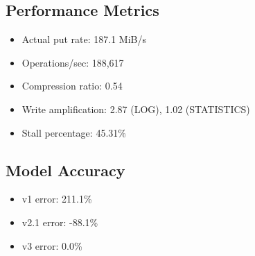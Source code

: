 \documentclass[11pt,twocolumn]{article}
\begin{document}
\subsection{Performance Metrics}
\begin{itemize}
    \item Actual put rate: 187.1 MiB/s
    \item Operations/sec: 188,617
    \item Compression ratio: 0.54
    \item Write amplification: 2.87 (LOG), 1.02 (STATISTICS)
    \item Stall percentage: 45.31\%
\end{itemize}

\subsection{Model Accuracy}
\begin{itemize}
    \item v1 error: 211.1\%
    \item v2.1 error: -88.1\%
    \item v3 error: 0.0\%
\end{itemize}
\end{document}
